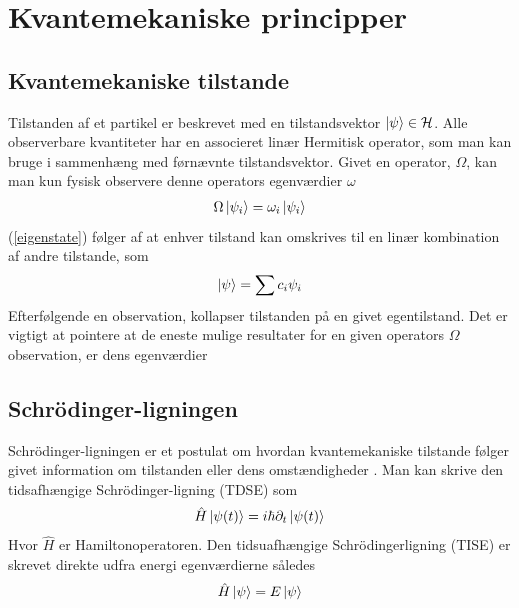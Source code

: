 \documentclass[12pt]{article}
\theoremstyle{definition}
\theoremstyle{remark}
\theoremstyle{definition}
\numberwithin{equation}{section}
\begin{document}
\section{Kvantemekaniske principper}
\subsection{Kvantemekaniske tilstande}
Tilstanden af et partikel er beskrevet med en tilstandsvektor $\ket
\psi\in \mathcal H$. Alle observerbare kvantiteter har en associeret linær Hermitisk operator, som man kan bruge i sammenhæng med førnævnte tilstandsvektor. Givet en operator, $\Omega$, kan man kun fysisk observere denne operators egenværdier $\omega$
\begin{align}
    \label{eigenstate}
    \Omega\ket{\psi_i} = \omega_i \ket{\psi_i}
\end{align}
(\ref{eigenstate}) følger af at enhver tilstand kan omskrives til en linær kombination af andre tilstande, som
\begin{align}
    \ket \psi = \sum c_i \psi_i
\end{align}
Efterfølgende en observation, kollapser tilstanden på en givet egentilstand. Det er vigtigt at pointere at de eneste mulige resultater for en given operators $\Omega$ observation, er dens egenværdier \parencite[115]{shankar}

\subsection{Schrödinger-ligningen}
Schrödinger-ligningen er et postulat om hvordan kvantemekaniske tilstande følger givet information om tilstanden eller dens omstændigheder \parencite[116]{shankar}. Man kan skrive den tidsafhængige Schrödinger-ligning (TDSE) som
\begin{align}
  \label{eq:schr}
  \hat H \ket{\psi(t)} = i\hbar \partial_t \ket{\psi(t)}
\end{align}
Hvor $\hat H$ er Hamiltonoperatoren. Den tidsuafhængige Schrödingerligning (TISE) er skrevet direkte udfra energi egenværdierne \parencite[145]{shankar} således
\begin{align}
    \label{tise}
    \hat H \ket \psi = E \ket \psi
\end{align}
\end{document}
